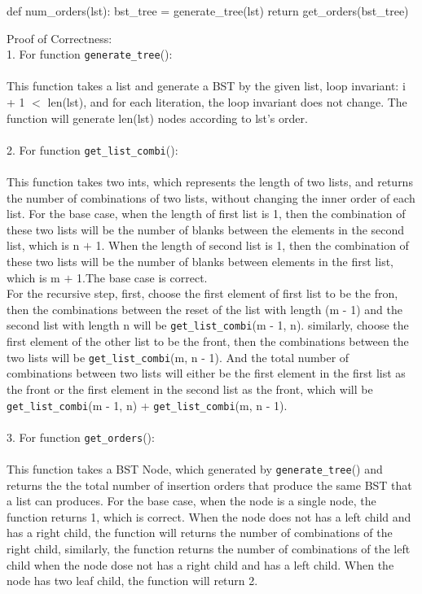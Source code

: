 \documentclass{assignment-263}
\begin{document}
\begin{enumerate}
\begin{python}
def num_orders(lst):
      bst_tree = generate_tree(lst)
      return get_orders(bst_tree)
\end{python}
Proof of Correctness:\\
1. For function \verb|generate_tree|():\\
\\ 
This function takes a list and generate a BST by the given list, loop invariant: i + 1 $<$ len(lst), and for each literation, the loop invariant does not change. The function will generate len(lst) nodes according to lst's order.\\
\\
2. For function \verb|get_list_combi|():\\
\\
This function takes two ints, which represents the length of two lists, and returns the number of combinations of two lists, without changing the inner order of each list. For the base case, when the length of first list is 1, then the combination of these two lists will be the number of blanks between the elements in the second list, which is n $+$ 1. When the length of second list is 1, then the combination of these two lists will be the number of blanks between elements in the first list, which is m $+$ 1.The base case is correct.\\
For the recursive step, first, choose the first element of first list to be the fron, then the combinations between the reset of the list with length (m - 1) and the second list with length n will be \verb|get_list_combi|(m - 1, n). similarly, choose the first element of the other list to be the front, then the combinations between the two lists will be \verb|get_list_combi|(m, n - 1). And the total number of combinations between two lists will either be the first element in the first list as the front or the first element in the second list as the front, which will be \verb|get_list_combi|(m - 1, n) + \verb|get_list_combi|(m, n - 1).\\
\\
3. For function \verb|get_orders|():\\
\\
This function takes a BST Node, which generated by \verb|generate_tree|() and returns the the total number of insertion orders that produce the same BST that a list can produces. For the base case, when the node is a single node, the function returns 1, which is correct. When the node does not has a left child and has a right child, the function will returns the number of combinations of the right child, similarly, the function returns the number of combinations of the left child when the node dose not has a right child and has a left child. When the node has two leaf child, the function will return 2.\\

\end{enumerate}
\end{document}
